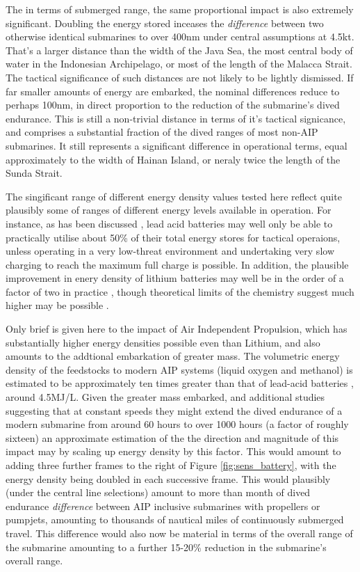 \documentclass{article}\usepackage[]{graphicx}\usepackage[]{color}
\begin{document}
The in terms of submerged range, the same proportional impact is also extremely significant.  Doubling the energy stored inceases the \textit{difference} between two otherwise identical submarines to over 400nm under central assumptions at 4.5kt.  That's a larger distance than the width of the Java Sea, the most central body of water in the Indonesian Archipelago, or most of the length of the Malacca Strait.  The tactical significance of such distances are not likely to be lightly dismissed. If far smaller amounts of energy are embarked, the nominal differences reduce to perhaps 100nm, in direct proportion to the reduction of the submarine's dived endurance.  This is still a non-trivial distance in terms of it's tactical signicance, and comprises a substantial fraction of the dived ranges of most non-AIP submarines.  It still represents a significant difference in operational terms, equal approximately to the width of Hainan Island, or neraly twice the length of the Sunda Strait.

The singificant range of different energy density values tested here reflect quite plausibly some of ranges of different energy levels available in operation.  For instance, as has been discussed \parencite{briggs2016, greenfield2016}, lead acid batteries may well only be able to practically utilise about 50\% of their total energy stores for tactical operaions, unless operating in a very low-threat environment and undertaking very slow charging to reach the maximum full charge is possible. In addition, the plausible improvement in enery density of lithium batteries may well be in the order of a factor of two in practice \parencite{greenfield2016}, though theoretical limits of the chemistry suggest much higher may be possible \parencite{davies2016}.

Only brief is given here to the impact of Air Independent Propulsion, which has substantially higher energy densities possible even than Lithium, and also amounts to the addtional embarkation of greater mass. The volumetric energy density of the feedstocks to modern AIP systems (liquid oxygen and methanol) is estimated to be approximately ten times greater than that of lead-acid batteries \parencite{davies2016}, around 4.5MJ/L.  Given the greater mass embarked, and additional studies suggesting that at constant speeds they might extend the dived endurance of a modern submarine from around 60 hours to over 1000 hours (a factor of roughly sixteen) an approximate estimation of the the direction and magnitude of this impact may by scaling up energy density by this factor.  This would amount to adding three further frames to the right of Figure \ref{fig:sens_battery}, with the energy density being doubled in each successive frame. This would plausibly (under the central line selections) amount to more than month of dived endurance \textit{difference} between AIP inclusive submarines with propellers or pumpjets, amounting to thousands of nautical miles of continuously submerged travel.  This difference would also now be material in terms of the overall range of the submarine amounting to a further 15-20\% reduction in the submarine's overall range.
\end{document}
